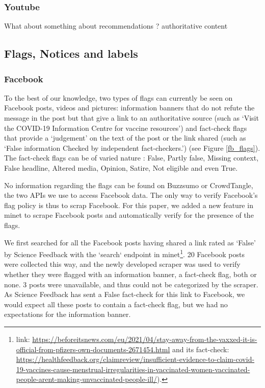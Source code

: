 \documentclass{article}
\begin{document}
\subsubsection{Youtube}

{\color{pink} What about something about recommendations ? authoritative content  }

\subsection{Flags, Notices and labels}

\subsubsection{Facebook}

To the best of our knowledge, two types of flags can currently be seen on Facebook posts, videos and pictures: information banners that do not refute the message in the post but that give a link to an authoritative source (such as ‘Visit the COVID-19 Information Centre for vaccine resources’) and fact-check flags that provide a ‘judgement’ on the text of the post or the link shared (such as ‘False information Checked by independent fact-checkers.’) (see Figure \ref{fb_flags}). The fact-check flags can be of varied nature : False, Partly false, Missing context, False headline, Altered media, Opinion, Satire, Not eligible and even True.

No information regarding the flags can be found on Buzzsumo or CrowdTangle, the two APIs we use to access Facebook data. The only way to verify Facebook’s flag policy is thus to scrap Facebook. For this paper, we added a new feature in minet to scrape Facebook posts and automatically verify for the presence of the flags.

We first searched for all the Facebook posts having shared a link rated as ‘False’ by Science Feedback with the `search` endpoint in minet\footnote{ link: \href{https://beforeitsnews.com/eu/2021/04/stay-away-from-the-vaxxed-it-is-official-from-pfizers-own-documents-2671454.html}{https://beforeitsnews.com/eu/2021/04/stay-away-from-the-vaxxed-it-is-official-from-pfizers-own-documents-2671454.html} and its fact-check: \href{https://healthfeedback.org/claimreview/insufficient-evidence-to-claim-covid-19-vaccines-cause-menstrual-irregularities-in-vaccinated-women-vaccinated-people-arent-making-unvaccinated-people-ill/}{https://healthfeedback.org/claimreview/insufficient-evidence-to-claim-covid-19-vaccines-cause-menstrual-irregularities-in-vaccinated-women-vaccinated-people-arent-making-unvaccinated-people-ill/}).}. 20 Facebook posts were collected this way, and the newly developed scraper was used to verify whether they were flagged with an information banner, a fact-check flag, both or none. 3 posts were unavailable, and thus could not be categorized by the scraper. As Science Feedback has sent a False fact-check for this link to Facebook, we would expect all these posts to contain a fact-check flag, but we had no expectations for the information banner. 
\end{document}
